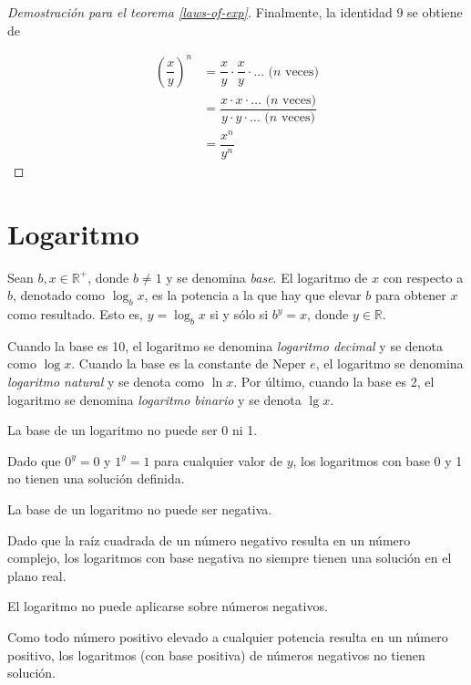 \begin{proof}[Demostración para el teorema \ref{laws-of-exp}]
    Finalmente, la identidad 9 se obtiene de
    
    \begin{align*}
        \left(\dfrac{x}{y}\right)^{n} &= \dfrac{x}{y}\cdot\dfrac{x}{y}\cdot\dots\text{ (}n\text{ veces)}\\
        &= \dfrac{x\cdot x\cdot\dots\text{ (}n\text{ veces)}}{y\cdot y\cdot\dots\text{ (}n\text{ veces)}}\\
        &= \dfrac{x^{n}}{y^{n}}
    \end{align*}
\end{proof}

\section{Logaritmo}

Sean $b,x\in\mathbb{R}^{+}$, donde $b\neq 1$ y se denomina \emph{base}.
El logaritmo de $x$ con respecto a $b$, denotado como
$\log_{b}x$, es la potencia a la que hay que elevar $b$ para obtener
$x$ como resultado. Esto es, $y=\log_{b}x$ si y sólo si $b^{y}=x$,
donde $y\in\mathbb{R}$.

Cuando la base es 10, el logaritmo se denomina \emph{logaritmo decimal} y se denota 
como $\log x$. Cuando la base es la constante de Neper $e$, el logaritmo se
denomina \emph{logaritmo natural} y se denota como $\ln x$. Por último, cuando la 
base es 2, el logaritmo se denomina \emph{logaritmo binario} y se denota $\lg x$.

\begin{prop}
    La base de un logaritmo no puede ser 0 ni 1.
\end{prop}

Dado que $0^y=0$ y $1^y=1$ para cualquier valor de $y$,
los logaritmos con base 0 y 1 no tienen una solución definida.

\begin{prop}
    \label{no-negative-bases}
    La base de un logaritmo no puede ser negativa.
\end{prop}

Dado que la raíz cuadrada de un número negativo resulta en un número complejo, 
los logaritmos con base negativa no siempre tienen una solución en el plano real.

\begin{prop}
    \label{no-negative-logarithm}
    El logaritmo no puede aplicarse sobre números negativos.
\end{prop}

Como todo número positivo elevado a cualquier potencia resulta 
en un número positivo, los logaritmos (con base positiva) 
de números negativos no tienen solución.

